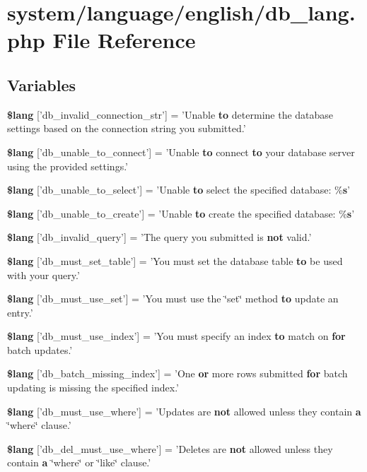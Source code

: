 \section{system/language/english/db\-\_\-lang.php File Reference}
\label{db__lang_8php}
\subsection*{Variables}
\begin{DoxyCompactItemize}
\item 
{\bf \$lang} ['db\-\_\-invalid\-\_\-connection\-\_\-str'] = 'Unable {\bf to} determine the database settings based on the connection string you submitted.'
\item 
{\bf \$lang} ['db\-\_\-unable\-\_\-to\-\_\-connect'] = 'Unable {\bf to} connect {\bf to} your database server using the provided settings.'
\item 
{\bf \$lang} ['db\-\_\-unable\-\_\-to\-\_\-select'] = 'Unable {\bf to} select the specified database\-: \%{\bf s}'
\item 
{\bf \$lang} ['db\-\_\-unable\-\_\-to\-\_\-create'] = 'Unable {\bf to} create the specified database\-: \%{\bf s}'
\item 
{\bf \$lang} ['db\-\_\-invalid\-\_\-query'] = 'The query you submitted is {\bf not} valid.'
\item 
{\bf \$lang} ['db\-\_\-must\-\_\-set\-\_\-table'] = 'You must set the database table {\bf to} be used with your query.'
\item 
{\bf \$lang} ['db\-\_\-must\-\_\-use\-\_\-set'] = 'You must use the \char`\"{}set\char`\"{} method {\bf to} update an entry.'
\item 
{\bf \$lang} ['db\-\_\-must\-\_\-use\-\_\-index'] = 'You must specify an index {\bf to} match on {\bf for} batch updates.'
\item 
{\bf \$lang} ['db\-\_\-batch\-\_\-missing\-\_\-index'] = 'One {\bf or} more rows submitted {\bf for} batch updating is missing the specified index.'
\item 
{\bf \$lang} ['db\-\_\-must\-\_\-use\-\_\-where'] = 'Updates are {\bf not} allowed unless they contain {\bf a} \char`\"{}where\char`\"{} clause.'
\item 
{\bf \$lang} ['db\-\_\-del\-\_\-must\-\_\-use\-\_\-where'] = 'Deletes are {\bf not} allowed unless they contain {\bf a} \char`\"{}where\char`\"{} or \char`\"{}like\char`\"{} clause.'
\item 

\end{DoxyCompactItemize}
